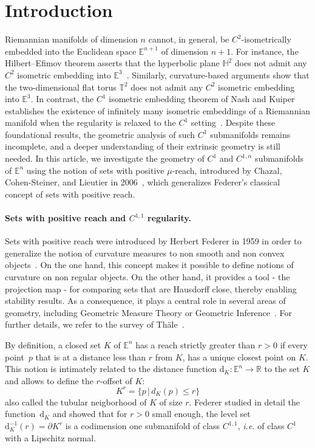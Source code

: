 \documentclass[11pt,reqno,a4paper]{article}%
\theoremstyle{definition}
\theoremstyle{remark}
\renewcommand{\leq}{\leqslant}
\renewcommand{\d}{\mathrm{d}}
\newcommand{\R}{\mathbb{R}}
\newcommand{\E}{\mathbb{E}}
\newcommand{\T}{\mathbb{T}}
\renewcommand{\H}{\mathbb{H}}
\renewcommand{\d}{\mathrm{d}}
\begin{document}
\section{Introduction}
Riemannian manifolds of dimension $n$ cannot, in general, be 
$C^2$-isometrically embedded into the Euclidean space $\E^{n+1}$ of dimension $n+1$. For instance, the Hilbert–Efimov theorem asserts that the hyperbolic plane $\H^2$ does not admit any $C^2$ isometric embedding into $\E^3$~\cite{efimov}. Similarly, curvature-based arguments show that the two-dimensional flat torus 
$\T^2$ does not admit any 
$C^2$ isometric embedding into 
$\E^3$. In contrast, the 
$C^1$ isometric embedding theorem of Nash and Kuiper establishes the existence of infinitely many isometric embeddings of a Riemannian manifold when the regularity is relaxed to the $C^1$ setting~\cite{n-c1ii-54,k-oc1ii-55,kuiperII}.
Despite these foundational results, the geometric analysis of such 
$C^1$ submanifolds remains incomplete, and a deeper understanding of their extrinsic geometry  
is still needed. In this article, we investigate the geometry of $C^1$ and $C^{1,\alpha}$ submanifolds of 
$\E^n$ using the notion of sets with positive 
$\mu$-reach, introduced by Chazal, Cohen-Steiner, and Lieutier in 2006~\cite{chazal2006sampling,Chazal-Lieutier}, which generalizes Federer's classical concept of sets with positive reach.

\paragraph{Sets with positive reach and $C^{1,1}$ regularity.} Sets with positive reach were introduced by Herbert Federer in 1959 in order to generalize the notion of curvature measures to non smooth and non convex objects~\cite{Federer59}. On the one hand, this concept makes it possible to define notions of curvature on non regular objects. On the other hand, it provides a tool - the projection map - for comparing sets that are Hausdorff close, thereby enabling stability results. As a consequence, it plays a central role in several areas of geometry, including Geometric Measure Theory or Geometric Inference~\cite{fu1993convergence,cohen2006second,chazal2009stability}. For further details, we refer to the survey of Th\"{a}le~\cite{thale200850}. 

By definition, a closed set $K$ of $\E^n$ has a reach  strictly greater than $r>0$ if every point~$p$ that is at a distance less than $r$ from $K$, has a unique closest point on $K$. This notion is intimately related to the distance function $\d_K:\E^n\to\R$ to the set $K$ and allows to define the $r$-offset of $K$:
\[K^r=\{p\,|\, d_K(p)\leq r\}\]
also called the tubular neigborhood of $K$ of size $r.$
Federer studied in detail the  function~$\d_K$ and showed that for $r>0$ small enough, the level set $\d_K^{-1}(r)=\partial K^r$ is a codimension one submanifold of class $C^{1,1}$, \textit{i.e.} of class $C^1$ with a Lipschitz normal.
\end{document}
